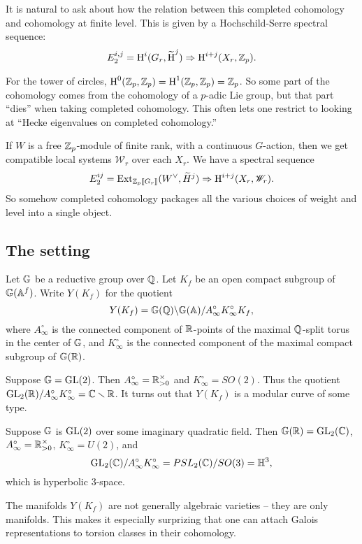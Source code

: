 It is natural to ask about how the relation between this completed cohomology 
and cohomology at finite level. This is given by a Hochschild-Serre spectral 
sequence:
\[
  E_2^{i,j} = \operatorname{H}^i(G_r,\widetilde {\operatorname{H}}^j{}) \Rightarrow \operatorname{H}^{i+j}(X_r,\mathbb{Z}_p) .
\]

For the tower of circles, $\operatorname{H}^0(\mathbb{Z}_p,\mathbb{Z}_p)=\operatorname{H}^1(\mathbb{Z}_p,\mathbb{Z}_p)=\mathbb{Z}_p$. 
So some part of the cohomology comes from the cohomology of a $p$-adic Lie group, 
but that part ``dies'' when taking completed cohomology. 
This often lets one restrict to looking at ``Hecke eigenvalues on completed 
cohomology.'' 

If $W$ is a free $\mathbb{Z}_p$-module of finite rank, with a continuous $G$-action, 
then we get compatible local systems $\mathscr W_r$ over each $X_r$. We have a 
spectral sequence 
\[
  E_2^{i j} = \operatorname{Ext}_{\mathbb{Z}_p\left\llbracket {G_r} \right\rrbracket}(W^\vee,\widetilde H^j{}) \Rightarrow \operatorname{H}^{i+j}(X_r,\mathscr W_r) .
\]
So somehow completed cohomology packages all the various choices of weight and 
level into a single object. 





\subsection{The setting}

Let $\mathbb{G}$ be a reductive group over $\mathbb{Q}$. Let $K_f$ be an open compact subgroup of 
$\mathbb{G}(\mathbb{A}^f)$. Write $Y(K_f)$ for the quotient 
\[
  Y(K_f) = \mathbb{G}(\mathbb{Q}) \backslash \mathbb{G}(\mathbb{A}) / A_\infty^\circ K_\infty^\circ K_f ,
\]
where $A_\infty^\circ$ is the connected component of $\mathbb{R}$-points of the maximal 
$\mathbb{Q}$-split torus in the center of $\mathbb{G}$, and $K_\infty^\circ$ is the connected 
component of the maximal compact subgroup of $\mathbb{G}(\mathbb{R})$. 

\begin{example}
Suppose $\mathbb{G}=\operatorname{GL}(2)$. Then $A_\infty^\circ=\mathbb{R}_{>0}^\times$ and $K_\infty^\circ=SO(2)$. 
Thus the quotient $\operatorname{GL}_2(\mathbb{R})/A_\infty^\circ K_\infty^\circ = \mathbb{C}\smallsetminus\mathbb{R}$. 
It turns out that $Y(K_f)$ is a modular curve of some type. 
\end{example}

Suppose $\mathbb{G}$ is $\operatorname{GL}(2)$ over some imaginary quadratic field. Then 
$\mathbb{G}(\mathbb{R})=\operatorname{GL}_2(\mathbb{C})$, $A_\infty^\circ=\mathbb{R}_{>0}^\times$, 
$K_\infty^\circ=U(2)$, and 
\[
  \operatorname{GL}_2(\mathbb{C}) / A_\infty^\circ K_\infty^\circ = PSL_2(\mathbb{C}) / SO(3) = \mathbb H^3 , 
\]
which is hyperbolic 3-space. 

The manifolds $Y(K_f)$ are not generally algebraic varieties -- they are only 
manifolds. This makes it especially surprizing that one can attach Galois 
representations to torsion classes in their cohomology. 

